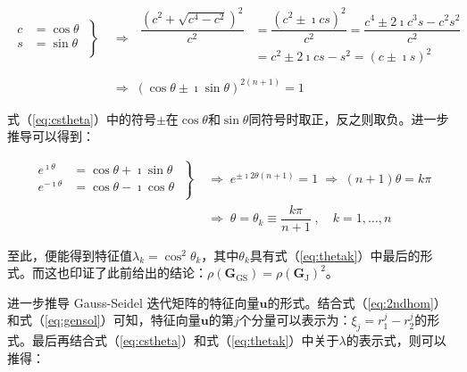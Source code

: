 \documentclass[12pt, UTF8, nofonts]{ctexart}
\begin{document}
\begin{equation}
  \label{eq:cstheta}
  \begin{aligned}
    \left.\begin{aligned}
      c &= \cos\theta \\
      s &= \sin\theta \\
    \end{aligned} \;\right\} &\;\Rightarrow\;
    \begin{aligned}
      \dfrac{\left(c^2+\sqrt{c^4-c^2}\right)^2}{c^2} &= \dfrac{\left(c^2 \pm \imath cs\right)^2}{c^2} = \dfrac{c^4 \pm 2\imath c^3s - c^2s^2}{c^2} \\
      &= c^2 \pm 2\imath cs - s^2 = (c \pm \imath s)^2 \\
    \end{aligned} \\
    &\;\Rightarrow\; (\cos\theta\pm\imath\sin\theta)^{2(n+1)} = 1
  \end{aligned}
\end{equation}

式（\ref{eq:cstheta}）中的符号$\pm$在$\cos\theta$和$\sin\theta$同符号时取正，反之则取负。进一步推导可以得到：

\begin{equation}
  \label{eq:thetak}
  \begin{aligned}
    \left.\begin{aligned}
      e^{\imath\theta} &= \cos\theta + \imath\sin\theta \\
      e^{-\imath\theta} &= \cos\theta - \imath\cos\theta \\
    \end{aligned}\;\right\} &\;\Rightarrow\;
    e^{\pm\imath2\theta(n+1)} = 1 \;\Rightarrow\; (n+1)\theta = k\pi \\
    &\;\Rightarrow\; \theta = \theta_k \equiv \dfrac{k\pi}{n+1} \;,\quad
    k=1,\ldots,n
  \end{aligned}
\end{equation}

至此，便能得到特征值$\lambda_k=\cos^2\theta_k$，其中$\theta_k$具有式（\ref{eq:thetak}）中最后的形式。而这也印证了此前给出的结论：$\rho(\boldsymbol{G}_{\mathrm{GS}})=\rho(\boldsymbol{G}_{\mathrm{J}})^2$。

进一步推导 Gauss-Seidel 迭代矩阵的特征向量$\boldsymbol{u}$的形式。结合式（\ref{eq:2ndhom}）和式（\ref{eq:gensol}）可知，特征向量$\boldsymbol{u}$的第$j$个分量可以表示为：$\xi_j=r_1^j-r_2^j$的形式。最后再结合式（\ref{eq:cstheta}）和式（\ref{eq:thetak}）中关于$\lambda$的表示式，则可以推得：
\end{document}
